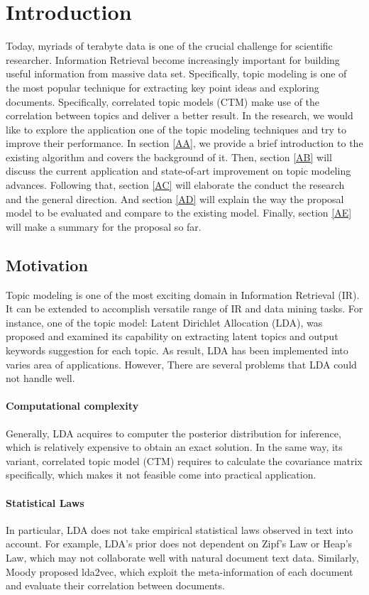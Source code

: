 \section{Introduction}\label{A}
Today, myriads of terabyte data is one of the crucial challenge for scientific researcher.  Information Retrieval become increasingly important for building useful information from massive data set. Specifically, topic modeling is one of the most popular technique for extracting key point ideas and exploring documents. Specifically, correlated topic models (CTM) make use of the correlation between topics and deliver a better result. In the research, we would like to explore the application one of the topic modeling techniques and try to improve their performance. In section \ref{AA}, we provide a brief introduction to the existing algorithm and covers the background of it. Then, section \ref{AB} will discuss the current application and state-of-art improvement on topic modeling advances. Following that, section \ref{AC} will elaborate the conduct the research and the general direction. And section \ref{AD} will explain the way the proposal model to be evaluated and compare to the existing model. Finally, section \ref{AE} will make a summary for the proposal so far.
\subsection{Motivation}
Topic modeling is one of the most exciting domain in Information Retrieval (IR). It can be extended to accomplish versatile range of IR and data mining tasks. For instance, one of the topic model: Latent Dirichlet Allocation (LDA), was proposed and examined its capability on extracting latent topics and output keywords suggestion for each topic. As result, LDA has been implemented into varies area of applications. However, There are several problems that LDA could not handle well.
\paragraph{Computational complexity}
Generally, LDA acquires to computer the posterior distribution for inference, which is relatively expensive to obtain an exact solution. In the same way, its variant, correlated topic model (CTM) requires to calculate the covariance matrix specifically, which makes it not feasible come into practical application.
\paragraph{Statistical Laws}In particular, LDA does not take empirical statistical laws observed in text into account. For example, LDA's prior does not dependent on Zipf's Law or Heap's Law, which may not collaborate well with natural document text data. Similarly, Moody\cite{moody_mixing_2016} proposed lda2vec, which exploit the meta-information of each document and evaluate their correlation between documents.
